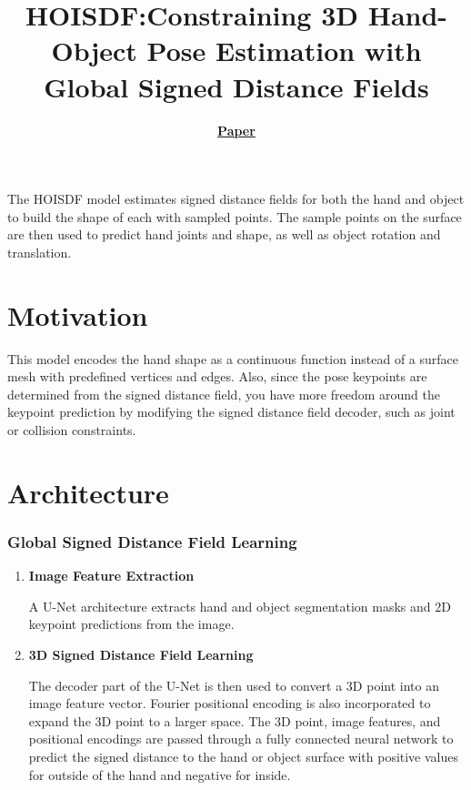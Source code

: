 \documentclass{article}
\title{HOISDF:\@ Constraining 3D Hand-Object Pose Estimation with Global Signed Distance Fields}
\author{\textbf{\href{https://arxiv.org/pdf/2402.17062}{Paper}}}
\date{}
\begin{document}
\maketitle

The HOISDF model estimates signed distance fields for both the hand and object to build the shape
of each with sampled points. The sample points on the surface are then used to predict hand joints
and shape, as well as object rotation and translation.

\section*{Motivation}
This model encodes the hand shape as a continuous function instead of a surface mesh with
predefined vertices and edges. Also, since the pose keypoints are determined from the signed
distance field, you have more freedom around the keypoint prediction by modifying the signed
distance field decoder, such as joint or collision constraints.

\section*{Architecture}

\subsubsection*{Global Signed Distance Field Learning}
\begin{enumerate}
    \item \textbf{Image Feature Extraction}
    
    A U-Net architecture extracts hand and object segmentation masks and 2D keypoint predictions
    from the image.

    \item \textbf{3D Signed Distance Field Learning}
    
    The decoder part of the U-Net is then used to convert a 3D point into an image feature vector.
    Fourier positional encoding is also incorporated to expand the 3D point to a larger space. The
    3D point, image features, and positional encodings are passed through a fully connected neural
    network to predict the signed distance to the hand or object surface with positive values for
    outside of the hand and negative for inside.
\end{enumerate}
\end{document}
